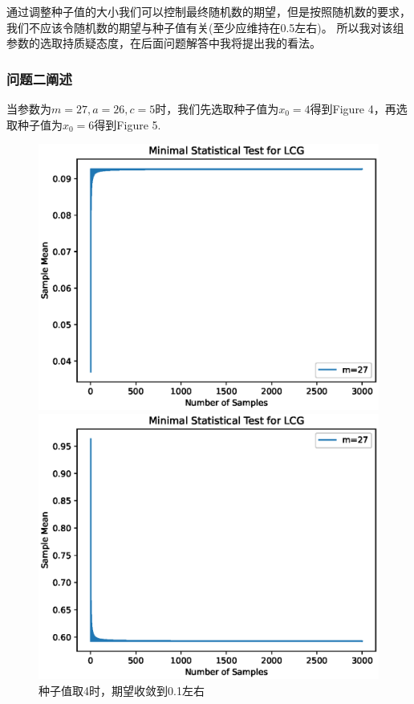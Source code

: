 \documentclass[12pt,a4paper]{article}%
\begin{document}
    通过调整种子值的大小我们可以控制最终随机数的期望，但是按照随机数的要求，我们不应该令随机数的期望与种子值有关(至少应维持在0.5左右)。
    所以我对该组参数的选取持质疑态度，在后面问题解答中我将提出我的看法。

    \subsubsection{问题二阐述}
    当参数为$m=27,a=26,c=5$时，我们先选取种子值为$x_0=4$得到Figure 4，再选取种子值为$x_0=6$得到Figure 5.

    \begin{figure}[H]%
        \centering
        \begin{minipage}{0.48\textwidth}
            \centering
            \includegraphics[width=1.1\textwidth]{Problem_2.1}
            \caption{\fontsize{10pt}{15pt}\selectfont 种子值取4时，期望收敛到0.1左右}
        \end{minipage}
        \hspace{0cm}%
        \hfill%
        \begin{minipage}{0.48\textwidth}
            \centering
            \includegraphics[width=1.1\textwidth]{Problem_2.2}

\end{minipage}
\end{figure}
\end{document}
